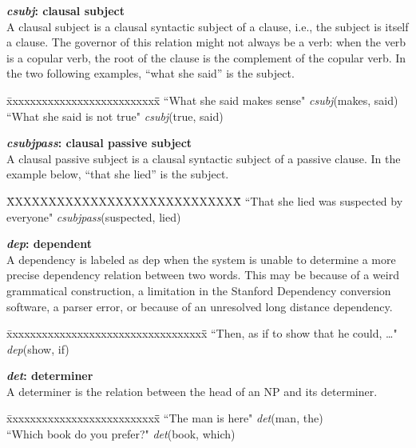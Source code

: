 \documentclass[11pt,letter]{article}
\begin{document}
\noindent\textbf{\emph{csubj}: clausal subject}\\
A clausal subject is a clausal syntactic subject of a clause, i.e., the subject is itself a clause. The governor of this relation might not always be a verb: when the verb is a copular verb, the root of the clause is the complement of the copular verb. In the two following examples, ``what she said'' is the subject.
\begin{tabbing}
\hspace{1cm} \= xxxxxxxxxxxxxxxxxxxxxxxxxx\= \hspace{.5cm}\=  \kill
\> ``What she said makes sense" \> \> \emph{csubj}(makes, said)\\
\hspace{1cm} \> ``What she said is not true" \> \>  \emph{csubj}(true, said)\\
\end{tabbing}

\noindent\textbf{\emph{csubjpass}: clausal passive subject}\\
A clausal passive subject is a clausal syntactic subject of a passive clause. In the example below, ``that she lied'' is the subject.
\begin{tabbing}
\hspace{1cm} \=XXXXXXXXXXXXXXXXXXXXXXXXXXXX\= \hspace{1cm}\=  \kill
\>  ``That she lied was suspected by everyone" \> \> \emph{csubjpass}(suspected, lied)\\
\end{tabbing}

\noindent\textbf{\emph{dep}: dependent}\\
A dependency is labeled as dep when the system is unable to determine a more precise dependency relation between two words.  This may be because of a weird grammatical construction, a limitation in the Stanford Dependency conversion software, a parser error, or because of an unresolved long distance dependency.
\begin{tabbing}
\hspace{1cm} \= xxxxxxxxxxxxxxxxxxxxxxxxxxxxxxxxxx\= \hspace{.5cm}\=  \kill
\>  ``Then, as if to show that he could, \ldots" \> \> \emph{dep}(show, if)\\
\end{tabbing}

\noindent\textbf{\emph{det}: determiner}\\
A determiner is the relation between the head of an NP and its determiner.
\begin{tabbing}
\hspace{1cm} \= xxxxxxxxxxxxxxxxxxxxxxxxxx\= \hspace{.5cm}\=  \kill
\>  ``The man is here" \> \> \emph{det}(man, the)\\
\> ``Which book do you prefer?" \> \> \emph{det}(book, which)\\
\end{tabbing}
\end{document}
